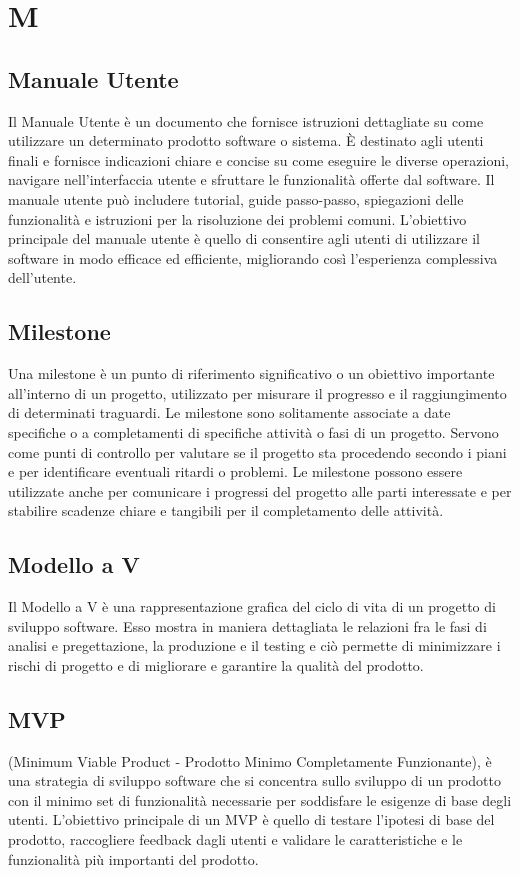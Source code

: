 \section*{M} 
\subsection*{Manuale Utente} 
Il Manuale Utente è un documento che fornisce istruzioni dettagliate su come utilizzare un determinato prodotto software o sistema. È destinato agli utenti finali e fornisce indicazioni chiare e concise su come eseguire le diverse operazioni, navigare nell'interfaccia utente e sfruttare le funzionalità offerte dal software. Il manuale utente può includere tutorial, guide passo-passo, spiegazioni delle funzionalità e istruzioni per la risoluzione dei problemi comuni. L'obiettivo principale del manuale utente è quello di consentire agli utenti di utilizzare il software in modo efficace ed efficiente, migliorando così l'esperienza complessiva dell'utente.
\subsection*{Milestone} 
Una milestone è un punto di riferimento significativo o un obiettivo importante all'interno di un progetto, utilizzato per misurare il progresso e il raggiungimento di determinati traguardi. Le milestone sono solitamente associate a date specifiche o a completamenti di specifiche attività o fasi di un progetto. Servono come punti di controllo per valutare se il progetto sta procedendo secondo i piani e per identificare eventuali ritardi o problemi. Le milestone possono essere utilizzate anche per comunicare i progressi del progetto alle parti interessate e per stabilire scadenze chiare e tangibili per il completamento delle attività.
\subsection*{Modello a V} 
Il Modello a V è una rappresentazione grafica del ciclo di vita di un progetto di sviluppo software. Esso mostra in maniera dettagliata le relazioni fra le fasi di analisi e pregettazione, la  produzione e il testing e ciò permette di minimizzare i rischi di progetto e di migliorare e garantire la qualità del prodotto.
\subsection{MVP} 
(Minimum Viable Product - Prodotto Minimo Completamente Funzionante), è una strategia di sviluppo software che si concentra sullo sviluppo di un prodotto con il minimo set di funzionalità necessarie per soddisfare le esigenze di base degli utenti. L'obiettivo principale di un MVP è quello di testare l'ipotesi di base del prodotto, raccogliere feedback dagli utenti e validare le caratteristiche e le funzionalità più importanti del prodotto.
